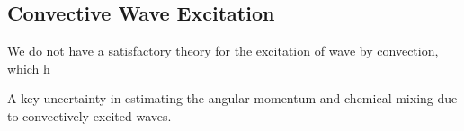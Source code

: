 {\color{purple}
\subsection{Convective Wave Excitation}
}

We do not have a satisfactory theory for the excitation of wave by convection, which h

A key uncertainty in estimating the angular momentum and chemical mixing due to convectively excited waves.
